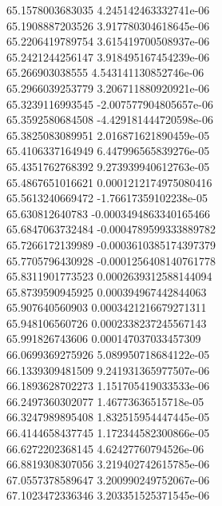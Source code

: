 {65.1578003683035 4.245142463332741e-06 \\
65.1908887203526 3.917780304618645e-06 \\
65.2206419789754 3.615419700508937e-06 \\
65.2421244256147 3.918495167454239e-06 \\
65.266903038555 4.543141130852746e-06 \\
65.2966039253779 3.206711880920921e-06 \\
65.3239116993545 -2.007577904805657e-06 \\
65.3592580684508 -4.429181444720598e-06 \\
65.3825083089951 2.016871621890459e-05 \\
65.4106337164949 6.447996565839276e-05 \\
65.4351762768392 9.273939940612763e-05 \\
65.4867651016621 0.0001212174975080416 \\
65.5613240669472 -1.76617359102238e-05 \\
65.630812640783 -0.0003494863340165466 \\
65.6847063732484 -0.0004789599333889782 \\
65.7266172139989 -0.0003610385174397379 \\
65.7705796430928 -0.0001256408140761778 \\
65.8311901773523 0.0002639312588144094 \\
65.8739590945925 0.000394967442844063 \\
65.907640560903 0.0003421216679271311 \\
65.948106560726 0.0002338237245567143 \\
65.991826743606 0.000147037033457309 \\
66.0699369275926 5.089950718684122e-05 \\
66.1339309481509 9.241931365977507e-06 \\
66.1893628702273 1.151705419033533e-06 \\
66.2497360302077 1.46773636515718e-05 \\
66.3247989895408 1.832515954447445e-05 \\
66.4144658437745 1.172344582300866e-05 \\
66.6272202368145 4.62427760794526e-06 \\
66.8819308307056 3.219402742615785e-06 \\
67.0557378589647 3.200990249752067e-06 \\
67.1023472336346 3.203351525371545e-06 \\
}
